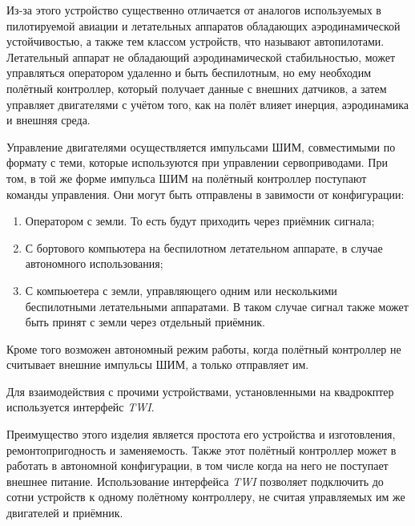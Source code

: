 Из-за этого устройство существенно отличается от аналогов
используемых в пилотируемой авиации и летательных аппаратов обладающих
аэродинамической устойчивостью, а также тем классом устройств, что называют
автопилотами. Летательный аппарат не обладающий аэродинамической
стабильностью, может управляться оператором удаленно и быть
беспилотным, но ему необходим полётный контроллер, который получает
данные с внешних датчиков, а затем управляет двигателями с учётом
того, как на полёт влияет инерция, аэродинамика и внешняя среда.


Управление двигателями осуществляется импульсами ШИМ, совместимыми по
формату с теми, которые используются при управлении
сервоприводами. При том, в той же форме импульса ШИМ на полётный
контроллер поступают команды управления.  Они могут быть отправлены в
завимости от конфигурации:
\begin{enumerate}
\item Оператором с земли. То есть будут приходить через приёмник сигнала;
\item С бортового компьютера на беспилотном летательном аппарате, в случае автономного использования;
\item С компьюетера с земли, управляющего одним или несколькими
беспилотными летательными аппаратами. В таком случае сигнал также
может быть принят с земли через отдельный приёмник.
\end{enumerate}
Кроме того возможен автономный режим работы, когда полётный контроллер
не считывает внешние импульсы ШИМ, а только отправляет им.

Для взаимодействия с прочими устройствами, установленными на
квадрокптер используется интерфейс \textit{TWI}.


Преимущество этого изделия является простота его устройства и
изготовления, ремонтопригодность и заменяемость.
Также этот полётный контроллер может в работать в автономной
конфигурации, в том числе когда на него не поступает внешнее питание.
Использование интерфейса \textit{TWI} позволяет подключить до сотни
устройств к одному полётному контроллеру, не считая управляемых им же
двигателей и приёмник.


